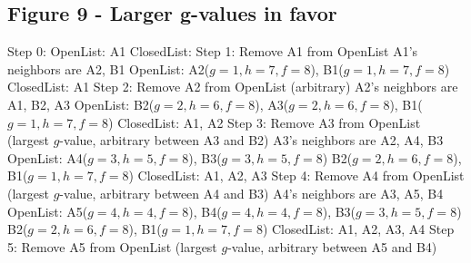 \documentclass[10pt,a4paper]{article}
\begin{document}
\subsection*{Figure 9 - Larger g-values in favor}
Step 0:\newline
OpenList: A1\newline
ClosedList: 
\newline\newline
Step 1:\newline
Remove A1 from OpenList\newline
A1's neighbors are A2, B1\newline
OpenList: A2($g = 1, h = 7, f = 8$), B1($g = 1, h = 7, f = 8$)\newline
ClosedList: A1
\newline\newline
Step 2:\newline
Remove A2 from OpenList (arbitrary)\newline
A2's neighbors are A1, B2, A3\newline
OpenList:  B2($g = 2, h = 6, f = 8$), A3($g = 2, h = 6, f = 8$), B1($g = 1, h = 7, f = 8$)\newline
ClosedList: A1, A2
\newline\newline
Step 3:\newline
Remove A3 from OpenList (largest $g$-value, arbitrary between A3 and B2)\newline
A3's neighbors are A2, A4, B3\newline
OpenList: A4($g = 3, h = 5, f = 8$), B3($g = 3, h = 5, f = 8$) B2($g = 2, h = 6, f = 8$), B1($g = 1, h = 7, f = 8$)\newline
ClosedList: A1, A2, A3
\newline\newline
Step 4:\newline
Remove A4 from OpenList (largest $g$-value, arbitrary between A4 and B3)\newline
A4's neighbors are A3, A5, B4\newline
OpenList: A5($g = 4, h = 4, f = 8$), B4($g = 4, h = 4, f = 8$), B3($g = 3, h = 5, f = 8$) B2($g = 2, h = 6, f = 8$), B1($g = 1, h = 7, f = 8$)\newline
ClosedList: A1, A2, A3, A4
\newline\newline
Step 5:\newline
Remove A5 from OpenList (largest $g$-value, arbitrary between A5 and B4)\newline
\end{document}
